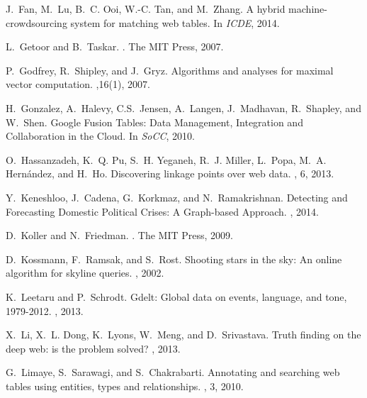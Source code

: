 \documentclass{sig-alternate}
\begin{document}
{\begin{thebibliography}{10}
J.~Fan, M.~Lu, B.~C. Ooi, W.-C. Tan, and M.~Zhang.
\newblock A hybrid machine-crowdsourcing system for matching web tables.
\newblock In {\em ICDE}, 2014.

L.~Getoor and B.~Taskar.
.
\newblock The MIT Press, 2007.

P.~Godfrey, R.~Shipley, and J.~Gryz.
\newblock Algorithms and analyses for maximal vector computation.
,16(1), 2007.

H.~Gonzalez, A.~Halevy, C.S.~Jensen, A.~Langen, J.~Madhavan, R.~Shapley, and W.~Shen.
\newblock Google Fusion Tables: Data Management, Integration and Collaboration in the Cloud.
\newblock In {\em SoCC}, 2010.

O.~Hassanzadeh, K.~Q. Pu, S.~H. Yeganeh, R.~J. Miller, L.~Popa, M.~A.
  Hern{\'a}ndez, and H.~Ho.
\newblock Discovering linkage points over web data.
, 6, 2013.

Y.~Keneshloo, J.~Cadena, G.~Korkmaz, and N.~Ramakrishnan.
\newblock Detecting and Forecasting Domestic Political Crises: A Graph-based Approach.
, 2014.


D.~Koller and N.~Friedman.
.
\newblock The MIT Press, 2009.

D.~Kossmann, F.~Ramsak, and S.~Rost.
\newblock Shooting stars in the sky: An online algorithm for skyline queries.
, 2002.

K.~Leetaru and P.~Schrodt.
\newblock Gdelt: Global data on events, language, and tone, 1979-2012.
, 2013.

X.~Li, X.~L. Dong, K.~Lyons, W.~Meng, and D.~Srivastava.
\newblock Truth finding on the deep web: is the problem solved?
, 2013.

G.~Limaye, S.~Sarawagi, and S.~Chakrabarti.
\newblock Annotating and searching web tables using entities, types and
  relationships.
, 3, 2010.


\end{thebibliography}}
\end{document}

